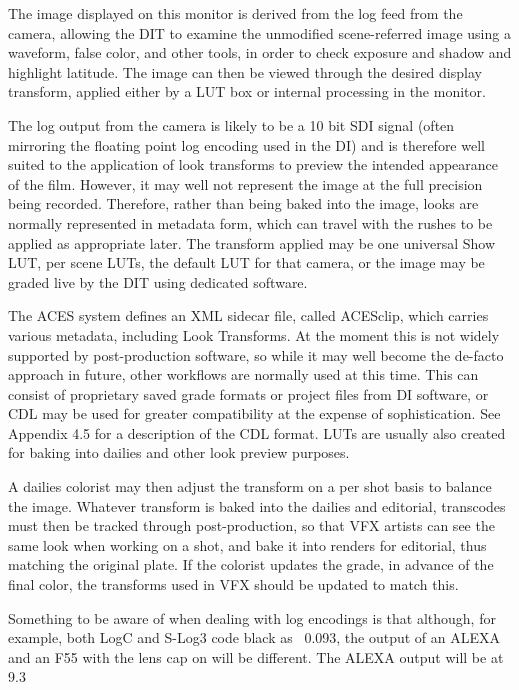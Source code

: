 The image displayed on this monitor is derived from the log feed from the camera, allowing the DIT to examine the unmodified scene-referred image using a waveform, false color, and other tools, in order to check exposure and shadow and highlight latitude. The image can then be viewed through the desired display transform, applied either by a LUT box or internal processing in the monitor.

The log output from the camera is likely to be a 10 bit SDI signal (often mirroring the floating point log encoding used in the DI) and is therefore well suited to the application of look transforms to preview the intended appearance of the film. However, it may well not represent the image at the full precision being recorded. Therefore, rather than being baked into the image, looks are normally represented in metadata form, which can travel with the rushes to be applied as appropriate later. The transform applied may be one universal Show LUT, per scene LUTs, the default LUT for that camera, or the image may be graded live by the DIT using dedicated software.

The ACES system defines an XML sidecar file, called ACESclip, which carries various metadata, including Look Transforms. At the moment this is not widely supported by post-production software, so while it may well become the de-facto approach in future, other workflows are normally used at this time. This can consist of proprietary saved grade formats or project files from DI software, or CDL may be used for greater compatibility at the expense of sophistication. See Appendix 4.5 for a description of the CDL format. LUTs are usually also created for baking into dailies and other look preview purposes.

A dailies colorist may then adjust the transform on a per shot basis to balance the image. Whatever transform is baked into the dailies and editorial, transcodes must then be tracked through post-production, so that VFX artists can see the same look when working on a shot, and bake it into renders for editorial, thus matching the original plate. If the colorist updates the grade, in advance of the final color, the transforms used in VFX should be updated to match this.

Something to be aware of when dealing with log encodings is that although, for example, both LogC and S-Log3 code black as ~0.093, the output of an ALEXA and an F55 with the lens cap on will be different. The ALEXA output will be at 9.3%

